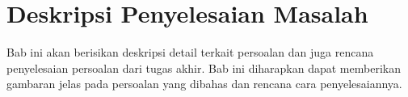 \chapter{Deskripsi Penyelesaian Masalah}


Bab ini akan berisikan deskripsi detail terkait persoalan dan juga rencana penyelesaian persoalan dari tugas akhir. Bab ini diharapkan dapat memberikan gambaran jelas pada persoalan yang dibahas dan rencana cara penyelesaiannya.












